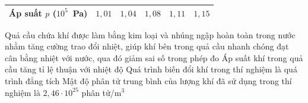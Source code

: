 \begin{ex}
\begin{center}
{\begin{tabular}{|l|*{5}{c|}}
				\hline
				Áp suất $p$ ($10^5$~Pa) & $1{,}01$ & $1{,}04$ & $1{,}08$ & $1{,}11$ & $1{,}15$\\
				\hline
			\end{tabular}}
		\end{center}
		\choiceTFt
		{\True Quả cầu chứa khí được làm bằng kim loại và nhúng ngập hoàn toàn trong nước nhằm tăng cường trao đổi nhiệt, giúp khí bên trong quả cầu nhanh chóng đạt cân bằng nhiệt với nước, qua đó giảm sai số trong phép đo}
		{Áp suất khí trong quả cầu tăng tỉ lệ thuận với nhiệt độ}
		{\True Quá trình biến đổi khí trong thí nghiệm là quá trình đẳng tích}
		{\True Mật độ phân tử trung bình của lượng khí đã sử dụng trong thí nghiệm là $2{,}46\cdot 10^{25}$ phân tử/m$^3$}
	\end{ex}

